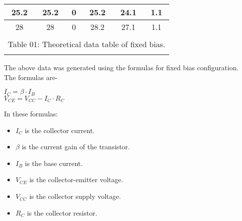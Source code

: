 \documentclass[a4paper, 12pt]{extarticle}
\begin{document}
\begin{table}[htbp]
\begin{tabular}{cccccc}
    \midrule
    \multicolumn{1}{|c|}{25.2} & \multicolumn{1}{c|}{25.2} & \multicolumn{1}{c|}{0} & \multicolumn{1}{c|}{25.2} & \multicolumn{1}{c|}{24.1} & \multicolumn{1}{c|}{1.1} \\
    \midrule
    \multicolumn{1}{|c|}{28} & \multicolumn{1}{c|}{28} & \multicolumn{1}{c|}{0} & \multicolumn{1}{c|}{28.2} & \multicolumn{1}{c|}{27.1} & \multicolumn{1}{c|}{1.1} \\
    \midrule
          &       &       &       &       &  \\
    \multicolumn{6}{c}{Table 01: Theoretical data table of fixed bias.} \\
          &       &       &       &       &  \\
    \end{tabular}%
  \label{tab:addlabel}%
\end{table}%
The above data was generated using the formulas for fixed bias configuration. The formulas are-\\
\begin{center}
$I_C = \beta \cdot I_B$\\
$V_{CE} = V_{CC} - I_C \cdot R_C$\\
\end{center}
In these formulas:
\begin{itemize}
    \item $I_C$ is the collector current.
    \item $\beta$ is the current gain of the transistor.
    \item $I_B$ is the base current.
    \item $V_{CE}$ is the collector-emitter voltage.
    \item $V_{CC}$ is the collector supply voltage.
    \item $R_C$ is the collector resistor.
\end{itemize}
\end{document}
